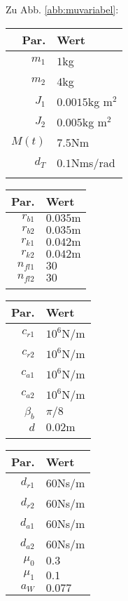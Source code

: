 Zu Abb. \ref{abb:muvariabel}: 
\begin{center}
\begin{tabular}{r|l}
Par.&Wert\\\hline
$m_1 $&$1$kg\\
$m_2 $&$ 4$kg\\
$J_1 $&$0.0015$kg m$^2$\\
$J_2 $&$ 0.005$kg m$^2$\\
$M(t) $&$7.5$Nm\\
$d_T$&$0.1$Nms/rad\\
&
\end{tabular}\hfill
\begin{tabular}{r|l}
Par.&Wert\\\hline
$r_{b1}$&$0.035\textrm{m}$\\
$r_{b2}$&$0.035\textrm{m}$\\
$r_{k1}$&$0.042\textrm{m}$\\
$r_{k2}$&$0.042\textrm{m}$\\
$n_{fl1}$&$30$\\
$n_{fl2}$&$30$\\
&
\end{tabular}\hfill
\begin{tabular}{r|l}
Par.&Wert\\\hline
$c_{r1}$&$10^{6}$N/m\\
$c_{r2}$&$10^{6}$N/m\\
$c_{a1}$&$10^{6}$N/m\\
$c_{a2}$&$10^{6}$N/m\\
$\beta_b $&$ \pi/8$\\
$d $&$ 0.02\textrm{m}$ \\
&
\end{tabular}\hfill
\begin{tabular}{r|l}
Par.&Wert\\\hline
$d_{r1}$&$60$Ns/m\\
$d_{r2}$&$60$Ns/m\\
$d_{a1}$&$60$Ns/m\\
$d_{a2}$&$60$Ns/m\\
$\mu_0$&$0.3$\\
$\mu_1$&$0.1$\\
$a_W $&$ 0.077$\\
\end{tabular}
\end{center}

